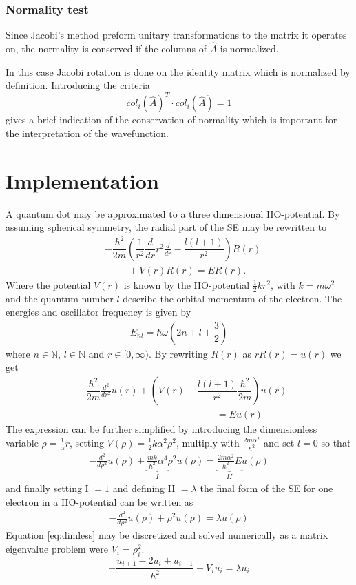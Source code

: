 \documentclass[twoside,twocolumn]{article}
\newcommand{\nl}{
	
	\medskip
	\noindent
}
\begin{document}
	\subsubsection{Normality test}	
	Since Jacobi's method preform unitary transformations to the matrix it operates on, the normality is conserved if the columns of $\hat{A}$ is normalized.\nl
	In this case Jacobi rotation is done on the identity matrix which is normalized by definition. Introducing the criteria $$col_i(\hat{A})^T\cdot col_i(\hat{A})=1$$ gives a brief indication of the conservation of normality which is important for the interpretation of the wavefunction.
	\section{Implementation}
	\label{sec:implementation}
	A quantum dot may be approximated to a three dimensional HO-potential. By assuming spherical symmetry, the radial part of the SE may be rewritten to
	\begin{align*}
	&-\dfrac{\hbar^2}{2 m} \left ( \dfrac{1}{r^2} \dfrac{d}{dr} r^2 \frac{d}{dr} - \dfrac{l (l + 1)}{r^2} \right )R(r)\\ 
	&\hspace{1cm}+ V(r) R(r)= E R(r).
	\end{align*}
	Where the potential $V(r)$ is known by the HO-potential $\frac{1}{2}kr^2$, with $k=m\omega^2$ and the quantum number $l$ describe the orbital momentum of the electron.
	The energies and oscillator frequency is given by
	\begin{align*}
	E_{nl} = \hbar\omega\left(2n+l+ \dfrac{3}{2} \right)
	\end{align*}
	where $n\in \mathbb N$, $l\in \mathbb N$ and $r \in [0,\infty)$. By rewriting $R(r)$ as $rR(r) = u(r)$ we get
	\begin{align*}
	&-\dfrac{\hbar^2}{2 m} \frac{d^2}{dr^2} u(r) + \left ( V(r) + \dfrac{l (l + 1)}{r^2}\dfrac{\hbar^2}{2 m} \right ) u(r)\\  
	&\hspace{6cm}=  E u(r)
	\end{align*}
	The expression can be further simplified by introducing the dimensionless variable $\rho = \frac{1}{\alpha}r$, setting $V(\rho) = \frac{1}{2}k\alpha^2\rho^2$, multiply with $\frac{2m\alpha^2}{\hbar^2}$ and set $l=0$ so that
	\begin{align*}
	-\frac{d^2}{d\rho^2} u(\rho) +\underbrace{ \frac{mk}{\hbar^2} \alpha^4}_{I}\rho^2u(\rho)  = \underbrace{\frac{2m\alpha^2}{\hbar^2}E}_{II}u(\rho)
	\end{align*}
	and finally setting I $=1$ and defining II $=\lambda$ the final form of the SE for one electron in a HO-potential can be written as
	\begin{align}
	-\frac{d^2}{d\rho^2} u(\rho) + \rho^2u(\rho)  = \lambda u(\rho)\label{eq:dimless}
	\end{align}
	Equation \ref{eq:dimless} may be discretized and solved numerically as a matrix eigenvalue problem were $V_i=\rho_i^2$. 
	\begin{equation}
	-\frac{u_{i+1}-2u_i+u_{i-1}}{h^2}+V_iu_i = \lambda u_i \label{eq:disk1}
	\end{equation}
\end{document}
